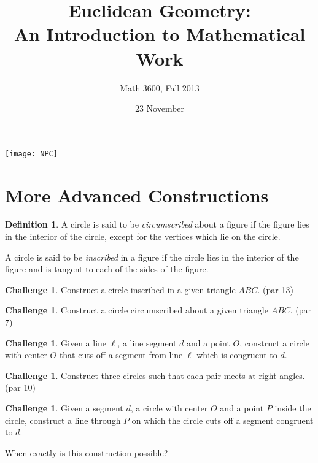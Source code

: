 \documentclass{tufte-handout}
\title{Euclidean Geometry:\\An Introduction to Mathematical Work}
\author[]{Math 3600, Fall 2013}
\date{23 November}
\theoremstyle{definition}
\newtheorem*{definition}{Definition}
\newtheorem{challenge}[problem]{Challenge}
\begin{document}
\maketitle

\begin{marginfigure}
    \texttt{[image: NPC]}
\end{marginfigure}

\setcounter{section}{12}
\section{More Advanced Constructions}

\begin{definition}\label{defn:circumscribed}
A circle is said to be \emph{circumscribed} about a figure if the figure lies in the interior of the circle, except for the vertices which lie on the circle.

A circle is said to be \emph{inscribed} in a figure if the circle lies in the interior of the figure and is tangent to each of the sides of the figure.
\end{definition}

\begin{challenge}\label{chal:triangle-inscribe-circle}
Construct a circle inscribed in a given triangle $ABC$. (par 13)
\end{challenge}

\begin{challenge}\label{chal:triangle-circumscribe-circle}
Construct a circle circumscribed about a given triangle $ABC$. (par 7)
\end{challenge}



\begin{challenge}\label{chal:cut-segment-by-circle}
Given a line $\ell$, a line segment $d$ and a point $O$, construct a circle with center $O$ that cuts off a segment from line $\ell$ which is congruent to $d$.
\end{challenge}



\begin{challenge}\label{chal:three-perp-circles}
Construct three circles such that each pair meets at right angles. (par 10)
\end{challenge}

\begin{challenge}\label{chal:cut-circle-by-segment}
Given a segment $d$, a circle with center $O$ and a point $P$ inside the circle, construct a line through $P$ on which the circle cuts off a segment congruent to $d$.

When exactly is this construction possible?
\end{challenge}
\end{document}
